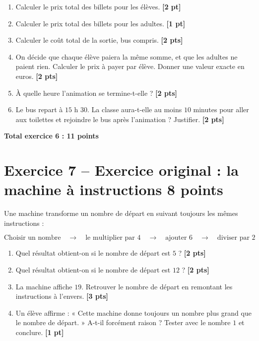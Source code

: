 \documentclass[11pt,a4paper]{article}
\newcommand{\pts}[1]{\hfill \textbf{[#1 pt]}}
\newcommand{\ptss}[1]{\hfill \textbf{[#1 pts]}}
\begin{document}
\begin{enumerate}[label=\textbf{\arabic*)}]

\item Calculer le prix total des billets pour les élèves. \pts{2}

\item Calculer le prix total des billets pour les adultes. \pts{1}

\item Calculer le coût total de la sortie, bus compris. \ptss{2}

\item On décide que chaque élève paiera la même somme, et que les adultes ne paient rien.
Calculer le prix à payer par élève. Donner une valeur exacte en euros. \ptss{2}

\item À quelle heure l'animation se termine-t-elle ? \ptss{2}

\item Le bus repart à $15$ h $30$.
La classe aura-t-elle au moins $10$ minutes pour aller aux toilettes et rejoindre le bus après l'animation ?
Justifier. \ptss{2}

\end{enumerate}

\hfill \textbf{Total exercice 6 : 11 points}

\section*{Exercice 7 -- Exercice original : la machine à instructions \hfill 8 points}

Une machine transforme un nombre de départ en suivant toujours les mêmes instructions :

\[
\boxed{
\text{Choisir un nombre}
\quad\longrightarrow\quad
\text{le multiplier par }4
\quad\longrightarrow\quad
\text{ajouter }6
\quad\longrightarrow\quad
\text{diviser par }2
}
\]

\begin{enumerate}[label=\textbf{\arabic*)}]

\item Quel résultat obtient-on si le nombre de départ est $5$ ? \ptss{2}

\item Quel résultat obtient-on si le nombre de départ est $12$ ? \ptss{2}

\item La machine affiche $19$.
Retrouver le nombre de départ en remontant les instructions à l'envers. \ptss{3}

\item Un élève affirme : « Cette machine donne toujours un nombre plus grand que le nombre de départ. »
A-t-il forcément raison ? Tester avec le nombre $1$ et conclure. \pts{1}

\end{enumerate}
\end{document}

